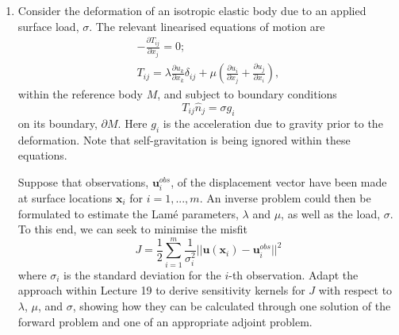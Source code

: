 \documentclass[a4paper,10pt]{paper}
\begin{document}
\begin{enumerate}
\begin{enumerate}
\item Supposing that $ \|\mathbf{d}\|^{2} > \chi^{2}_{c}$, the region of the model space defined by the inequality in (a) does not contain the origin. In such 
cases, the closest point within this region to the origin must lie on the boundary-set defined by 
\begin{equation*}
    \|\mathbf{A}\mathbf{m}-\mathbf{d}\|^{2} = \chi^{2}_{c}.
\end{equation*}
Using the method of Lagrange multipliers, we can determine this \emph{minimum norm solution} by considering the Lagrangian
\begin{equation*}
    \mathcal{L}(\mathbf{m},\mu)=\|\mathbf{m}\|^{2}+\mu(\|\mathbf{A}\mathbf{m}-\mathbf{d}\|^{2}-\chi^{2}_{c}), 
\end{equation*}
where $\mu$ is a Lagrange multiplier. Derive the equations for $\mathbf{m}$ and $\mu$ that must hold at the minimum norm solution. 
Discuss the relationship between this approach and regularised least squares. 
\end{enumerate}


\item Consider the deformation of an isotropic elastic body due to an applied surface load, $\sigma$. The relevant linearised equations of motion are
\begin{gather*}
    -\frac{\partial T_{ij}}{\partial x_{j}}=0; \\
    T_{ij}=\lambda\frac{\partial u_{k}}{\partial x_{k}}\delta_{ij}+\mu\left(\frac{\partial u_{i}}{\partial x_{j}}+\frac{\partial u_{j}}{\partial x_{i}}\right),
\end{gather*}
within the reference body $M$, and subject to boundary conditions
\begin{equation*}
    T_{ij}\hat{n}_{j}=\sigma g_{i}
\end{equation*}
on its boundary, $\partial M$. Here $g_{i}$ is the acceleration due to gravity prior to the deformation. Note that self-gravitation is being ignored within these equations.

Suppose that observations, $\mathbf{u}_{i}^{obs}$, of the displacement vector have been made at surface locations $\mathbf{x}_i$ for $i=1,...,m$. An inverse problem could then be formulated to estimate the Lamé parameters, $\lambda$ and $\mu$, as well as the load, $\sigma$. To this end, we can seek to minimise the misfit
\begin{equation*}
    J=\frac{1}{2}\sum_{i=1}^{m}\frac{1}{\sigma_{i}^2}||\mathbf{u}(\mathbf{x}_{i})-\mathbf{u}_{i}^{obs}||^{2}
\end{equation*}
where $\sigma_{i}$ is the standard deviation for the $i$-th observation. Adapt the approach within Lecture 19 to derive sensitivity kernels for $J$ with respect to $\lambda$, $\mu$, and $\sigma$, showing how they can be calculated through one solution of the forward problem and one of an appropriate adjoint problem.






\end{enumerate}
\end{document}
